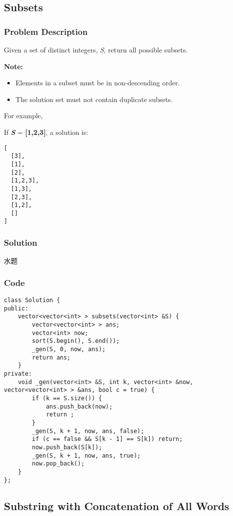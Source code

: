 \documentclass[courier]{article}
\begin{document}
\begin{CJK*}{UTF8}{gkai}
\subsection{ Subsets }

\subsubsection*{Problem Description}
Given a set of distinct integers, \emph{S}, return all possible subsets.

\textbf{Note:}



\begin{itemize}
\item Elements in a subset must be in non-descending order.
\item The solution set must not contain duplicate subsets.
\end{itemize}

For example,


If \textbf{\emph{S}} = \textbf{[1,2,3]}, a solution is:

\begin{verbatim}
[
  [3],
  [1],
  [2],
  [1,2,3],
  [1,3],
  [2,3],
  [1,2],
  []
]
\end{verbatim}


\subsubsection*{Solution}
水题

\subsubsection*{Code}
\begin{lstlisting}
class Solution {
public:
    vector<vector<int> > subsets(vector<int> &S) {
        vector<vector<int> > ans;
        vector<int> now;
        sort(S.begin(), S.end());
        _gen(S, 0, now, ans);
        return ans;
    }
private:
    void _gen(vector<int> &S, int k, vector<int> &now, vector<vector<int> > &ans, bool c = true) {
        if (k == S.size()) {
            ans.push_back(now);
            return ;
        }
        _gen(S, k + 1, now, ans, false);
        if (c == false && S[k - 1] == S[k]) return;
        now.push_back(S[k]);
        _gen(S, k + 1, now, ans, true);
        now.pop_back();
    }
}; 
\end{lstlisting}


\subsection{ Substring with Concatenation of All Words }


\end{CJK*}
\end{document}
